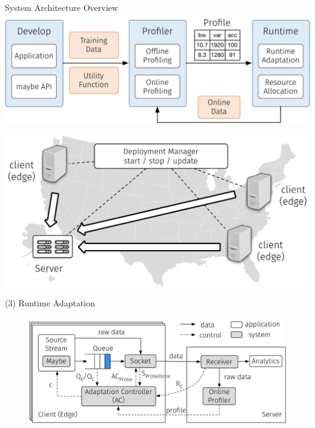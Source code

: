 \begin{frame}{System Architecture Overview}
  \centering
  \includegraphics[width=0.8\linewidth]{figures/arch.pdf}\\
  \centering
  \includegraphics[width=0.7\linewidth]{figures/arch-2.pdf}
\end{frame}




\begin{frame}{(3) Runtime Adaptation}
  \begin{figure}
    \centering
    \includegraphics[width=\linewidth]{figures/runtime-adaptation.pdf}
  \end{figure}
\end{frame}





